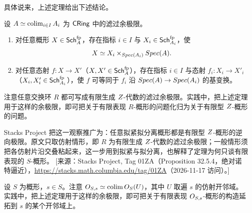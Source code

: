 具体说来，上述定理给出下述结论。

\begin{corollary}\label{cor:23.3.2}
设 $A \simeq \operatorname*{colim}_{i \in I} A_i$ 为 $\mathsf{CRing}$ 中的滤过余极限。
\begin{enumerate}[label=(\roman*),leftmargin=2em,itemsep=0.25ex]
  \item 对任意概形 $X \in \mathsf{Sch}^{\mathrm{fp}}_A$，存在指标 $i \in I$ 与 $X_i \in \mathsf{Sch}^{\mathrm{fp}}_{A_i}$，使
  \[
  X \simeq X_i \times_{Spec(A_i)} Spec(A).
  \]
  \item 对任意态射 $f\colon X \to X'$（$X, X' \in \mathsf{Sch}^{\mathrm{fp}}_A$），存在指标 $i \in I$ 与态射 $f_i\colon X_i \to X'_i$（$X_i, X'_i \in \mathsf{Sch}^{\mathrm{fp}}_{A_i}$），使 $f$ 可等同于 $f_i$ 沿 $Spec(A) \to Spec(A_i)$ 的基变换。
\end{enumerate}
\end{corollary}

\begin{example}\label{ex:23.3.3}
注意任意交换环 $R$ 都可写成有限生成 $Z$-代数的滤过余极限。实践中，把上述定理用于这样的余极限，即可把关于有限表现 $R$-概形的问题化归为关于有限型 $Z$-概形的问题。
\end{example}

\begin{yizhu}
Stacks Project 把这一观察推广为：任意拟紧拟分离概形都是有限型 $Z$-概形的逆向极限。原文只取仿射情形，即 $R$ 为有限生成 $Z$-代数的滤过余极限；一般情形须把各仿射片沿交叠粘起来，这一步用到拟紧与拟分离，也解释了定理为何只谈有限表现的 $S$-概形。
[来源：Stacks Project, Tag 01ZA（Proposition 32.5.4，绝对诺特逼近），\url{https://stacks.math.columbia.edu/tag/01ZA}（2026-11-17 访问）。]
\end{yizhu}

\begin{example}\label{ex:23.3.4}
设 $S$ 为概形，$s \in S$。注意 $O_{S,s} \simeq \operatorname*{colim} O_S(U)$，其中 $U$ 取遍 $s$ 的仿射开邻域。实践中，把上述定理用于这样的余极限，即可把关于有限表现 $O_{S,s}$-概形的构造延拓到 $s$ 的某个开邻域上。
\end{example}
